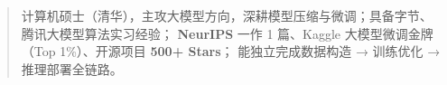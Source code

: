 
\makeheader

\begin{abstract}
计算机硕士（清华），主攻大模型方向，深耕模型压缩与微调；具备字节、腾讯大模型算法实习经验；
\textbf{NeurIPS} 一作 1 篇、Kaggle 大模型微调金牌（Top 1\%）、开源项目 \textbf{500+ Stars}；
能独立完成数据构造 → 训练优化 → 推理部署全链路。
\end{abstract}
